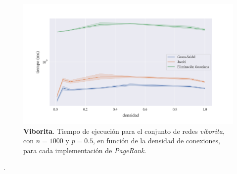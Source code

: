 \vspace{1em}
\begin{figure}[!htbp]
    \centering
    \includegraphics[width=.9\textwidth]{files/src/.media/densidad_viborita.png}
    \caption{\textbf{Viborita}. Tiempo de ejecución para el conjunto de redes \textit{viborita}, con $n = 1000$ y $p = 0.5$, en función de la densidad de conexiones, para cada implementación de \textit{PageRank}.}
    \label{densidad_viborita}
\end{figure}

.